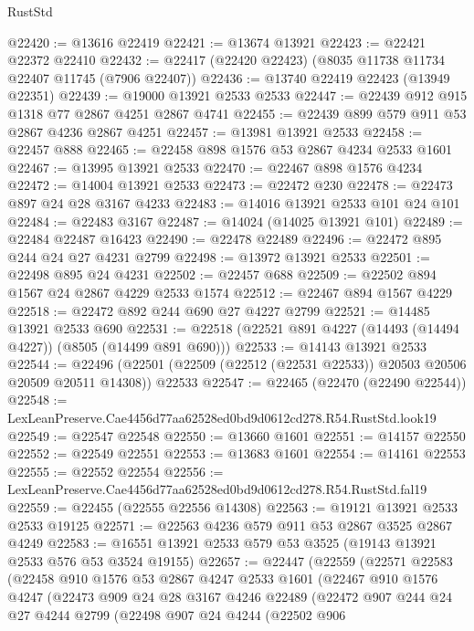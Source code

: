 \begin{lexlean}{RustStd}
\begin{coremodule}
@22420 := @13616 @22419
@22421 := @13674 @13921
@22423 := @22421 @22372 @22410
@22432 := @22417 (@22420 @22423) (@8035 @11738 @11734 @22407 @11745 (@7906 @22407))
@22436 := @13740 @22419 @22423 (@13949 @22351)
@22439 := @19000 @13921 @2533 @2533
@22447 := @22439 @912 @915 @1318 @77 @2867 @4251 @2867 @4741
@22455 := @22439 @899 @579 @911 @53 @2867 @4236 @2867 @4251
@22457 := @13981 @13921 @2533
@22458 := @22457 @888
@22465 := @22458 @898 @1576 @53 @2867 @4234 @2533 @1601
@22467 := @13995 @13921 @2533
@22470 := @22467 @898 @1576 @4234
@22472 := @14004 @13921 @2533
@22473 := @22472 @230
@22478 := @22473 @897 @24 @28 @3167 @4233
@22483 := @14016 @13921 @2533 @101 @24 @101
@22484 := @22483 @3167
@22487 := @14024 (@14025 @13921 @101)
@22489 := @22484 @22487 @16423
@22490 := @22478 @22489
@22496 := @22472 @895 @244 @24 @27 @4231 @2799
@22498 := @13972 @13921 @2533
@22501 := @22498 @895 @24 @4231
@22502 := @22457 @688
@22509 := @22502 @894 @1567 @24 @2867 @4229 @2533 @1574
@22512 := @22467 @894 @1567 @4229
@22518 := @22472 @892 @244 @690 @27 @4227 @2799
@22521 := @14485 @13921 @2533 @690
@22531 := @22518 (@22521 @891 @4227 (@14493 (@14494 @4227)) (@8505 (@14499 @891 @690)))
@22533 := @14143 @13921 @2533
@22544 := @22496
    (@22501 (@22509 (@22512 (@22531 @22533)) @20503 @20506 @20509 @20511 @14308))
    @22533
@22547 := @22465 (@22470 (@22490 @22544))
@22548 := LexLeanPreserve.Cae4456d77aa62528ed0bd9d0612cd278.R54.RustStd.look19
@22549 := @22547 @22548
@22550 := @13660 @1601
@22551 := @14157 @22550
@22552 := @22549 @22551
@22553 := @13683 @1601
@22554 := @14161 @22553
@22555 := @22552 @22554
@22556 := LexLeanPreserve.Cae4456d77aa62528ed0bd9d0612cd278.R54.RustStd.fal19
@22559 := @22455 (@22555 @22556 @14308)
@22563 := @19121 @13921 @2533 @2533 @19125
@22571 := @22563 @4236 @579 @911 @53 @2867 @3525 @2867 @4249
@22583 := @16551 @13921 @2533 @579 @53 @3525 (@19143 @13921 @2533 @576 @53 @3524 @19155)
@22657 := @22447
    (@22559
      (@22571
        @22583
        (@22458
          @910
          @1576
          @53
          @2867
          @4247
          @2533
          @1601
          (@22467
            @910
            @1576
            @4247
            (@22473
              @909
              @24
              @28
              @3167
              @4246
              @22489
              (@22472
                @907
                @244
                @24
                @27
                @4244
                @2799
                (@22498
                  @907
                  @24
                  @4244
                  (@22502
                    @906

\end{coremodule}
\end{lexlean}
